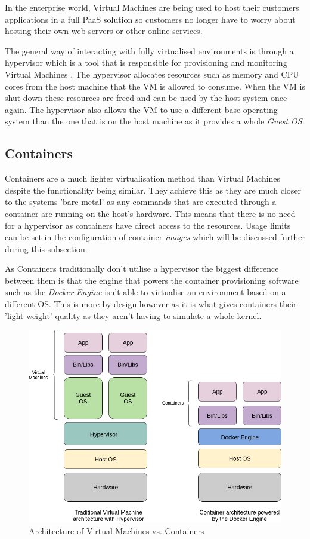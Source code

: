 In the enterprise world, Virtual Machines are being used to host their customers applications in a full PaaS solution so customers no longer have to worry about hosting their own web servers or other online services.

The general way of interacting with fully virtualised environments is through a hypervisor which is a tool that is responsible for provisioning and monitoring Virtual Machines \cite{hypervisor}. The hypervisor allocates resources such as memory and CPU cores from the host machine that the VM is allowed to consume. When the VM is shut down these resources are freed and can be used by the host system once again. The hypervisor also allows the VM to use a different base operating system than the one that is on the host machine as it provides a whole \textit{Guest OS}.

\subsection{Containers}

Containers are a much lighter virtualisation method than  Virtual Machines despite the functionality being similar. They achieve this as they are much closer to the systems 'bare metal' as any commands that are executed through a container are running on the host's hardware. This means that there is no need for a hypervisor as containers have direct access to the resources. Usage limits can be set in the configuration of container \textit{images} which will be discussed further during this subsection.

As Containers traditionally don't utilise a hypervisor the biggest difference between them is that the engine that powers the container provisioning software such as the \textit{Docker Engine} isn't able to virtualise an environment based on a different OS. This is more by design however as it is what gives containers their 'light weight' quality as they aren't having to simulate a whole kernel.

\begin{figure}[h!]
    \centering
    \includegraphics[scale=0.4]{res/Virtualisation.png}
    \caption{Architecture of Virtual Machines vs. Containers}
    \label{fig:architecture}
\end{figure}

